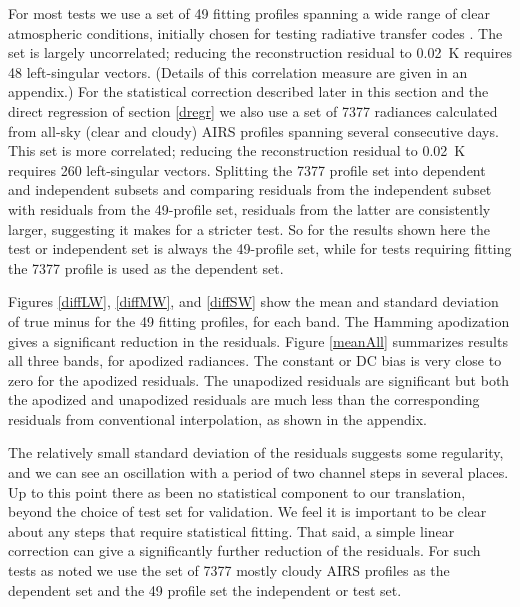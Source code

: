\documentclass[10pt,twocolumn]{article}
\begin{document}
For most tests we use a set of 49 fitting profiles spanning a wide
range of clear atmospheric conditions, initially chosen for testing
radiative transfer codes \cite{sarta1,sarta2}.  The set is largely
uncorrelated; reducing the reconstruction residual to 0.02~K
requires 48 left-singular vectors.  (Details of this correlation
measure are given in an appendix.)  For the statistical correction
described later in this section and the direct regression of section
\ref{dregr} we also use a set of 7377 radiances calculated from
all-sky (clear and cloudy) AIRS profiles spanning several
consecutive days.  This set is more correlated; reducing the
reconstruction residual to 0.02~K requires 260 left-singular
vectors.  Splitting the 7377 profile set into dependent and
independent subsets and comparing residuals from the independent
subset with residuals from the 49-profile set, residuals from the
latter are consistently larger, suggesting it makes for a stricter
test.  So for the results shown here the test or independent set is
always the 49-profile set, while for tests requiring fitting the
7377 profile is used as the dependent set.

Figures \ref{diffLW}, \ref{diffMW}, and \ref{diffSW} show the mean
and standard deviation of true {\cris} minus {\airs} {\cris} for the
49 fitting profiles, for each {\cris} band.  The Hamming apodization
gives a significant reduction in the residuals.  Figure \ref{meanAll}
summarizes results all three bands, for apodized radiances.  The
constant or DC bias is very close to zero for the apodized residuals.
The unapodized residuals are significant but both the apodized and
unapodized residuals are much less than the corresponding residuals
from conventional interpolation, as shown in the appendix.



The relatively small standard deviation of the residuals suggests
some regularity, and we can see an oscillation with a period of two
channel steps in several places.  Up to this point there as been no
statistical component to our translation, beyond the choice of test
set for validation.  We feel it is important to be clear about any
steps that require statistical fitting.  That said, a simple linear
correction can give a significantly further reduction of the
residuals.  For such tests as noted we use the set of 7377 mostly
cloudy AIRS profiles as the dependent set and the 49 profile set the
independent or test set.
\end{document}

